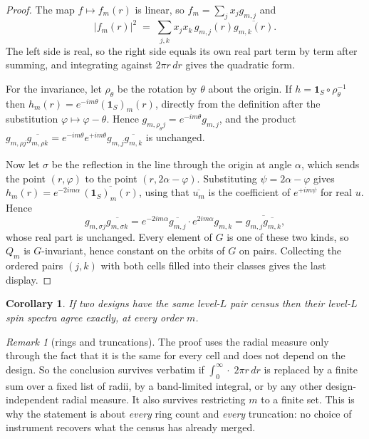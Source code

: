 \documentclass[11pt]{amsart}
\newtheorem{corollary}[theorem]{Corollary}
\theoremstyle{definition}
\theoremstyle{remark}
\newtheorem{remark}[theorem]{Remark}
\begin{document}
\begin{proof}
The map $f \mapsto f_m(r)$ is linear, so $f_m = \sum_j x_j g_{m,j}$ and
\[
|f_m(r)|^2 \;=\; \sum_{j,k} x_j x_k \, g_{m,j}(r) \overline{g_{m,k}(r)} .
\]
The left side is real, so the right side equals its own real part term by term after summing, and integrating against $2\pi r\,dr$ gives the quadratic form.

For the invariance, let $\rho_\theta$ be the rotation by $\theta$ about the origin. If $h = \mathbf 1_S \circ \rho_\theta^{-1}$ then $h_m(r) = e^{-im\theta} (\mathbf 1_S)_m(r)$, directly from the definition after the substitution $\varphi \mapsto \varphi - \theta$. Hence $g_{m,\rho_\theta j} = e^{-im\theta} g_{m,j}$, and the product $g_{m,\rho j}\overline{g_{m,\rho k}} = e^{-im\theta} e^{+im\theta} g_{m,j}\overline{g_{m,k}}$ is unchanged.

Now let $\sigma$ be the reflection in the line through the origin at angle $\alpha$, which sends the point $(r,\varphi)$ to the point $(r, 2\alpha - \varphi)$. Substituting $\psi = 2\alpha - \varphi$ gives $h_m(r) = e^{-2im\alpha}\, \overline{(\mathbf 1_S)_m(r)}$, using that $\overline{u_m}$ is the coefficient of $e^{+im\psi}$ for real $u$. Hence
\[
g_{m,\sigma j}\overline{g_{m,\sigma k}} = e^{-2im\alpha}\overline{g_{m,j}} \cdot e^{2im\alpha} g_{m,k} = \overline{ g_{m,j} \overline{g_{m,k}} } ,
\]
whose real part is unchanged. Every element of $G$ is one of these two kinds, so $Q_m$ is $G$-invariant, hence constant on the orbits of $G$ on pairs. Collecting the ordered pairs $(j,k)$ with both cells filled into their classes gives the last display.
\end{proof}

\begin{corollary}
\label{cor:census}
If two designs have the same level-$L$ pair census then their level-$L$ spin spectra agree exactly, at every order $m$.
\end{corollary}

\begin{remark}[rings and truncations]
\label{rem:rings}
The proof uses the radial measure only through the fact that it is the same for every cell and does not depend on the design. So the conclusion survives verbatim if $\int_0^\infty \cdot\; 2\pi r\, dr$ is replaced by a finite sum over a fixed list of radii, by a band-limited integral, or by any other design-independent radial measure. It also survives restricting $m$ to a finite set. This is why the statement is about \emph{every} ring count and \emph{every} truncation: no choice of instrument recovers what the census has already merged.
\end{remark}
\end{document}
